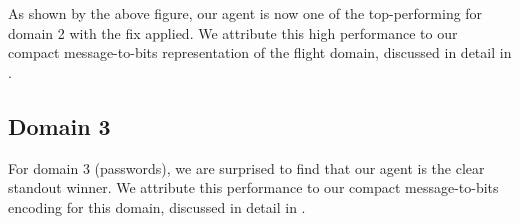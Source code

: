 \documentclass[titlepage]{article}
\begin{document}
As shown by the above figure, our agent is now one of the top-performing for domain 2 with the fix applied. We attribute this high performance to our compact message-to-bits representation of the flight domain, discussed in detail in .

\subsection{Domain 3}
For domain 3 (passwords), we are surprised to find that our agent is the clear standout winner. We attribute this performance to our compact message-to-bits encoding for this domain, discussed in detail in .
\end{document}
